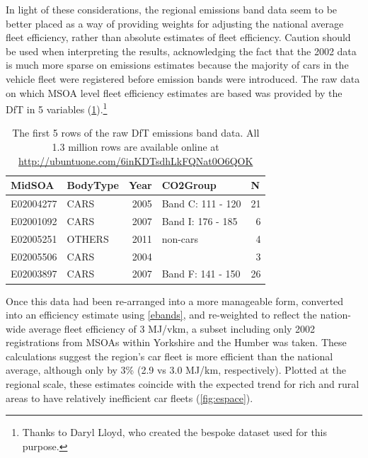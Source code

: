 In light of these considerations, the regional emissions band data seem to be
better placed as a way of providing weights for adjusting the
national average fleet efficiency, rather than absolute estimates of
fleet efficiency. Caution should be used when interpreting the results,
acknowledging the fact that the 2002 data is much more sparse on
emissions estimates because the majority of cars in the vehicle fleet
were registered before emission bands were introduced.
The raw
data on which MSOA level fleet efficiency estimates are based was provided by
the DfT in 5 variables (\cref{tefraw}).\footnote{Thanks to Daryl Lloyd,
who created the bespoke dataset
used for this purpose.
}

\begin{table}[htbp]
\caption[The first 5 rows of the raw DfT emissions band data]
{The first 5 rows of the raw DfT emissions band data. All 1.3 million
rows are available online at \href{http://ubuntuone.com/6inKDTsdhLkFQNat0O6QOK}
{http://ubuntuone.com/6inKDTsdhLkFQNat0O6QOK}}
\begin{center}
\begin{tabular}{llrlr}
\toprule
MidSOA & BodyType & \multicolumn{1}{l}{Year} & CO2Group & \multicolumn{1}{l}{N} \\
\midrule
E02004277 & CARS & 2005 & Band C: 111 - 120 & 21 \\
E02001092 & CARS & 2007 & Band I: 176 - 185 & 6 \\
E02005251 & OTHERS & 2011 & non-cars & 4 \\
E02005506 & CARS & 2004 &  & 3 \\
E02003897 & CARS & 2007 & Band F: 141 - 150 & 26 \\
\bottomrule
\end{tabular} \end{center}
\label{tefraw}
\end{table}

Once this data had been re-arranged into a more manageable form, converted into
an efficiency estimate using \cref{ebands}, and re-weighted to reflect the nation-wide
average fleet efficiency of 3 MJ/vkm,
a subset including only 2002 registrations from MSOAs within
Yorkshire and the Humber was taken. These calculations suggest the region's car fleet is more
efficient than the national average, although only by 3\% (2.9 vs 3.0 MJ/km, respectively).
Plotted at the regional scale, these estimates coincide with the expected trend for rich
and rural areas to have relatively inefficient car fleets (\cref{fig:espace}).

